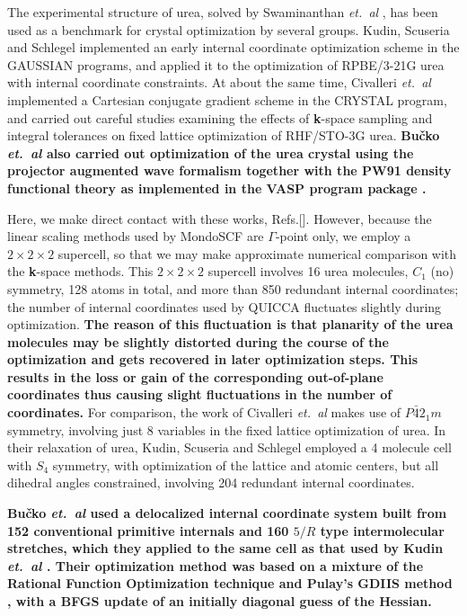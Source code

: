 \twolinestyle{\documentclass[prb,preprint]{revtex4}}
\begin{document}
The experimental structure of urea, solved by Swaminanthan {\em et.~al} \cite{SSwaminathan84},
has been used as a benchmark for crystal optimization by several groups.  
Kudin, Scuseria and Schlegel \cite{KKudin01} implemented an early internal coordinate 
optimization scheme in the GAUSSIAN programs, and applied it to the optimization of
RPBE/3-21G urea with internal coordinate constraints.  At about the same time,  
Civalleri {\em et.~al} \cite{BCivalleri01} implemented a Cartesian conjugate gradient 
scheme in the CRYSTAL program, and carried out careful studies examining the effects of 
{\bf k}-space sampling and integral tolerances on fixed lattice optimization of RHF/STO-3G urea.
{\bf
Bu\v{c}ko {\em et.~al} \cite{TBucko05} also carried out optimization of the
urea crystal using the projector augmented wave formalism together with the PW91
density functional theory as implemented in the VASP program package \cite{GKresse96}. 
}

Here, we make direct contact with these works, Refs.[].
However, because the linear scaling methods used by {\sc MondoSCF} are $\Gamma$-point only, 
we employ a $2\times2\times2$ supercell, so that we may make approximate numerical 
comparison with the {\bf k}-space methods.  This $2\times2\times2$ supercell involves 
16 urea molecules, $C_1$ (no) symmetry, 128 atoms in total, and more than 850 redundant internal 
coordinates;  the number of internal coordinates used by QUICCA fluctuates slightly during optimization.  
{\bf  The reason of this fluctuation is that planarity of the urea molecules
may be slightly distorted during the course of the optimization and gets 
recovered in later optimization steps. This results
in the loss or gain of the corresponding out-of-plane coordinates thus
causing slight fluctuations in the number of coordinates.
}
For comparison, the work of Civalleri {\em et.~al} \cite{BCivalleri01} makes use of $P\bar{4}2_1m$ 
symmetry, involving just 8 variables in the fixed lattice optimization of urea.  In their 
relaxation of urea, Kudin, Scuseria and Schlegel \cite{KKudin01} 
employed a 4 molecule cell with $S_4$ symmetry, with optimization of the lattice and 
atomic centers, but all dihedral angles constrained, involving 204 redundant internal 
coordinates.

{\bf
Bu\v{c}ko {\em et.~al} \cite{TBucko05} used a delocalized internal coordinate system built
from 152 conventional primitive internals and 160 $5/R$ type intermolecular
stretches, which they applied to the same cell as that used by Kudin {\em et.~al} \cite{KKudin01}.
Their optimization method was based on a mixture of the Rational Function 
Optimization technique and Pulay's GDIIS method \cite{FEckert97}, with a
BFGS \cite{RFletcher81} update of an initially diagonal guess of the
Hessian.
}
\end{document}
